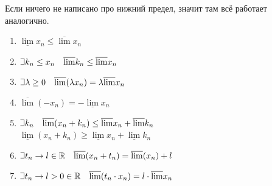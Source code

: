 \documentclass{article}
\def\letus{%
\mathord{\setbox0=\hbox{$\exists$}%
         \hbox{\kern 0.125\wd0%
               \vbox to \ht0{%
                  \hrule width 0.75\wd0%
                  \vfill%
                  \hrule width 0.75\wd0}%
               \vrule height \ht0%
               \kern 0.125\wd0}%
       }%
        }
\begin{document}
Если ничего не написано про нижний предел, значит там всё работает аналогично.
\begin{enumerate}
    \item $\underline{\lim} x_n \le \overline{\lim} x_n$
    \item $\letus k_n \le x_n \quad \overline{\lim} k_n \le \overline{\lim} x_n$
    \item $\letus \lambda \ge 0 \quad \overline{\lim} (\lambda x_n) = \lambda \overline{\lim} x_n$
    \item $\overline{\lim} (-x_n) = -\underline{\lim} x_n$
    \item $\letus k_n \quad \overline{\lim} (x_n + k_n) \le \overline{\lim} x_n + \overline{\lim} k_n$\\
    $\underline{\lim} (x_n + k_n) \ge \underline{\lim}x_n + \underline{\lim}k_n$
    \item $\letus t_n \rightarrow l \in \mathbb{R} \quad \overline{\lim} (x_n + t_n) = \overline{\lim} (x_n) + l$
    \item $\letus t_n \rightarrow l > 0 \in \mathbb{R} \quad \overline{\lim} (t_n \cdot x_n) = l \cdot \overline{\lim} x_n$
\end{enumerate}
\end{document}
